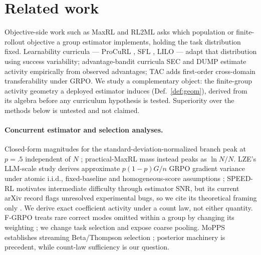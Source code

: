 
\section{Related work}

Objective-side work such as MaxRL \citep{maxrl} and RL2ML \citep{rl2ml} asks
which population or finite-rollout objective a group estimator implements,
holding the task distribution fixed. Learnability curricula --- ProCuRL
\citep{procurl}, SFL \citep{sfl}, LILO \citep{lilo} --- adapt that distribution
using success variability; advantage-bandit curricula SEC \citep{sec} and DUMP
\citep{dump} estimate activity empirically from observed advantages; TAC
\citep{tac} adds first-order cross-domain transferability under GRPO. We study
a complementary object: the finite-group activity geometry a deployed estimator
induces (Def.~\ref{def:geom}), derived from its algebra before any curriculum
hypothesis is tested. Superiority over the methods below is untested and not
claimed.

\paragraph{Concurrent estimator and selection analyses.}
Closed-form magnitudes for the standard-deviation-normalized branch peak at
$p=.5$ independent of $N$ \citep{groupstd,actorcurator}; practical-MaxRL mass
instead peaks as $\ln N/N$. LZE's LLM-scale study derives approximate
$p(1-p)G/n$ GRPO gradient variance under atomic i.i.d., fixed-baseline and
homogeneous-score assumptions \citep{lze}; SPEED-RL motivates intermediate
difficulty through estimator SNR, but its current arXiv record flags unresolved
experimental bugs, so we cite its theoretical framing only \citep{speedrl}.
We derive exact coefficient activity under a count law, not either quantity.
F-GRPO treats rare correct modes omitted within a group by changing its
weighting \citep{fgrpo}; we change task selection and expose coarse pooling.
MoPPS establishes streaming Beta/Thompson selection \citep{mopps}; posterior
machinery is precedent, while count-law sufficiency is our question.

